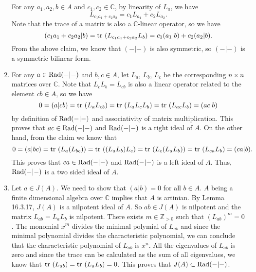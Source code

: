 \documentclass[a4paper, 12pt]{article}
\begin{document}
\begin{solution}
\begin{enumerate}[(1)]
For any \(a_1,a_2,b\in A\) and \(c_1,c_2\in \mathbb{C}\), by linearity of \(L_a\), we have 
\[L_{c_1a_1+c_2a_2}=c_1L_{a_1}+c_2L_{a_2}.\]
Note that the trace of a matrix is also a \(\mathbb{C}\)-linear operator, so we have 
\[(c_1a_1+c_2a_2|b)=\text{tr}\ (L_{c_1a_1+c_2a_2}L_b)=c_1(a_1|b)+c_2(a_2|b).\]
From the above claim, we know that \((-|-)\) is also symmetric, so \((-|-)\) is a symmetric bilinear form.
\item For any \(a\in \text{Rad}(-|-)\) and \(b,c\in A\), let \(L_a\), \(L_b\), \(L_c\) be the corresponding \(n\times n\) matrices over \(\mathbb{C}\). Note that \(L_cL_b=L_{cb}\) is also a linear operator related to the element \(cb\in A\), so we have 
\[0=(a|cb)=\text{tr}\ (L_aL_{cb})=\text{tr}\ (L_aL_cL_b)=\text{tr}\ (L_{ac}L_b)=(ac|b)\] 
by definition of \(\text{Rad}(-|-)\) and associativity of matrix multiplication. This proves that \(ac\in \text{Rad}(-|-)\) and \(\text{Rad}(-|-)\) is a right ideal of \(A\). On the other hand, from the claim we know that 
\[0=(a|bc)=\text{tr}\ (L_a(L_{bc}))=\text{tr}\ ((L_aL_b)L_c)=\text{tr}\ (L_c(L_aL_b))=\text{tr}\ (L_{ca}L_b)=(ca|b).\]
This proves that \(ca\in \text{Rad}(-|-)\) and \(\text{Rad}(-|-)\) is a left ideal of \(A\). Thus, \(\text{Rad}(-|-)\) is a two sided ideal of \(A\). 
\item Let \(a\in J(A)\). We need to show that \((a|b)=0\) for all \(b\in A\). \(A\) being a finite dimensional algebra over \(\mathbb{C}\) implies that \(A\) is artinian. By Lemma 16.3.17, \(J(A)\) is a nilpotent ideal of \(A\). So \(ab\in J(A)\) is nilpotent and the matrix 
\(L_{ab}=L_aL_b\) is nilpotent. There exists \(m\in \mathbb{Z}_{>0}\) such that \((L_{ab})^m=0\). The monomial \(x^m\) divides the minimal polymial of \(L_{ab}\) and since the minimal polynomial divides the characteristic polynomial, we can conclude that the characteristic polynomial of 
\(L_{ab}\) is \(x^n\). All the eigenvalues of \(L_{ab}\) is zero and since the trace can be calculated as the sum of all eigenvalues, we know that \(\text{tr}\ (L_{ab})=\text{tr}\ (L_aL_b)=0\). This proves that \(J(A)\subset \text{Rad}(-|-)\). 


\end{enumerate}
\end{solution}
\end{document}
